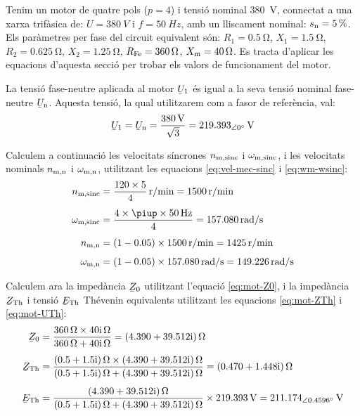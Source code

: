 \begin{exemple}\label{ex:CaractMotor}
	\addcontentsxms{\CaractMotor}	
    Tenim un motor de quatre pols ($p=4$) i tensió nominal \qty{380}{V}, connectat a una xarxa trifàsica de: $U=\qty{380}{V}$ i $f=\qty{50}{Hz}$, amb un lliscament nominal: $s_\mathrm{n}=\qty{5}{\percent}$. Els paràmetres per fase del circuit equivalent són: $R_1=\qty{0,5}{\ohm}$, $X_1=\qty{1,5}{\ohm}$, $R_2=\qty{0,625}{\ohm}$, $X_2=\qty{1,25}{\ohm}$, $R_\mathrm{Fe}=\qty{360}{\ohm}$, $X_\mathrm{m}=\qty{40}{\ohm}$. Es tracta d'aplicar les equacions d'aquesta secció per trobar els valors de funcionament del motor.

    La tensió fase-neutre aplicada al motor $\cmplx{U}_1$ és igual a la seva tensió nominal  fase-neutre  $\cmplx{U}\ped{n}$. Aquesta tensió, la qual utilitzarem com a fasor de referència, val:
    \[
        \cmplx{U}_1 = \cmplx{U}\ped{n} = \frac{\qty{380}{V}}{\sqrt{3}} = \qtypd{219,393}{0}{V}
    \]

    Calculem a continuació les velocitats síncrones $n_\mathrm{m,sinc}$ i $\omega_\mathrm{m,sinc}$, i les velocitats nominals $n_\mathrm{m,n}$ i $\omega_\mathrm{m,n}$, utilitzant les equacions \eqref{eq:vel-mec-sinc} i \eqref{eq:wm-wsinc}:
    \begin{align*}
        n\ped{m,sinc} &= \frac{120\times 5}{4} \, \unit{r/min} = \qty{1500}{r/min} \\[1ex]
        \omega\ped{m,sinc} &= \frac{4 \times\piup \times\qty{50}{Hz}}{4} =  \qty{157,080}{rad/s} \\[1ex]
        n\ped{m,n} &= (1-\num{0,05})\times \qty{1500}{r/min} = \qty{1425}{r/min} \\[1ex]
        \omega\ped{m,n} &= (1-\num{0,05}) \times\qty{157,080}{rad/s} = \qty{149,226}{rad/s}
    \end{align*}

    Calculem ara la impedància $\cmplx{Z}_0$ utilitzant l'equació \eqref{eq:mot-Z0}, i la impedància $\cmplx{Z}\ped{Th}$ i tensió $\cmplx{E}\ped{Th}$ Thévenin equivalents utilitzant les equacions \eqref{eq:mot-ZTh} i \eqref{eq:mot-UTh}:
     \begin{align*}
        \cmplx{Z}_0 &= \frac{\qty{360}{\ohm}\times\complexqty{j40}{\ohm}}{\qty{360}{\ohm}+\complexqty{j40}{\ohm}} = \complexqty{4,390+j39,512}{\ohm} \\[1ex]
        \cmplx{Z}\ped{Th} &= \frac{\complexqty{0,5+j1,5}{\ohm}\times\complexqty{4,390+j39,512}{\ohm}}
        {\complexqty{0,5+j1,5}{\ohm}+\complexqty{4,390+j39,512}{\ohm}} =  \complexqty{0,470+j1,448}{\ohm} \\[1ex]
        \cmplx{E}\ped{Th}  &= \frac{\complexqty{4,390+j39,512}{\ohm}}
        {\complexqty{0,5+j1,5}{\ohm}+\complexqty{4,390+j39,512}{\ohm}}\times\qty{219,393}{V} =  \qtypd{211,174}{0,4596}{V}
    \end{align*}


\end{exemple}
